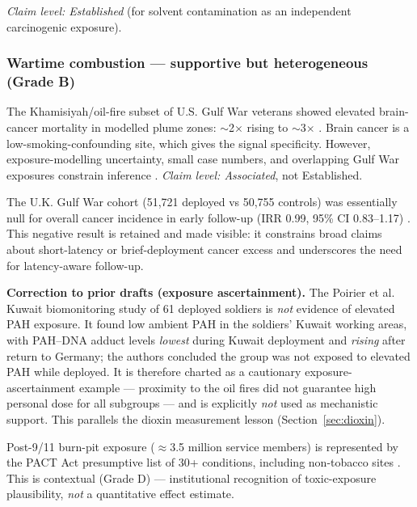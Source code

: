 \documentclass[3p,times]{elsarticle}
\begin{document}
\emph{Claim level: Established} (for solvent contamination as an independent carcinogenic exposure).

\subsubsection{Wartime combustion --- supportive but heterogeneous (Grade B)}
The Khamisiyah/oil-fire subset of U.S. Gulf War veterans showed elevated brain-cancer mortality in modelled plume zones: $\sim$2$\times$ \citep{bullman2005} rising to $\sim$3$\times$ \citep{barth2009}. Brain cancer is a low-smoking-confounding site, which gives the signal specificity. However, exposure-modelling uncertainty, small case numbers, and overlapping Gulf War exposures constrain inference \citep{gao2004,haley2013}. \emph{Claim level: Associated}, not Established.

The U.K. Gulf War cohort (51,721 deployed vs 50,755 controls) was essentially null for overall cancer incidence in early follow-up (IRR 0.99, 95\% CI 0.83--1.17) \citep{macfarlane2003}. This negative result is retained and made visible: it constrains broad claims about short-latency or brief-deployment cancer excess and underscores the need for latency-aware follow-up.

\textbf{Correction to prior drafts (exposure ascertainment).} The Poirier et al.\ \citep{poirier1998} Kuwait biomonitoring study of 61 deployed soldiers is \emph{not} evidence of elevated PAH exposure. It found low ambient PAH in the soldiers' Kuwait working areas, with PAH--DNA adduct levels \emph{lowest} during Kuwait deployment and \emph{rising} after return to Germany; the authors concluded the group was not exposed to elevated PAH while deployed. It is therefore charted as a cautionary exposure-ascertainment example --- proximity to the oil fires did not guarantee high personal dose for all subgroups --- and is explicitly \emph{not} used as mechanistic support. This parallels the dioxin measurement lesson (Section~\ref{sec:dioxin}).

Post-9/11 burn-pit exposure ($\approx$3.5 million service members) is represented by the PACT Act presumptive list of 30+ conditions, including non-tobacco sites \citep{pact2022,nasem2020}. This is contextual (Grade D) --- institutional recognition of toxic-exposure plausibility, \emph{not} a quantitative effect estimate.
\end{document}
